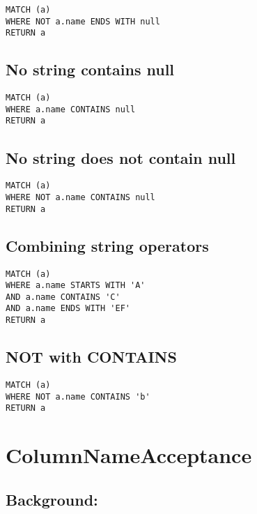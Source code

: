 \begin{lstlisting}
MATCH (a)
WHERE NOT a.name ENDS WITH null
RETURN a
\end{lstlisting}

\subsection{No string contains null}

\begin{lstlisting}
MATCH (a)
WHERE a.name CONTAINS null
RETURN a
\end{lstlisting}

\subsection{No string does not contain null}

\begin{lstlisting}
MATCH (a)
WHERE NOT a.name CONTAINS null
RETURN a
\end{lstlisting}

\subsection{Combining string operators}

\begin{lstlisting}
MATCH (a)
WHERE a.name STARTS WITH 'A'
AND a.name CONTAINS 'C'
AND a.name ENDS WITH 'EF'
RETURN a
\end{lstlisting}

\subsection{NOT with CONTAINS}

\begin{lstlisting}
MATCH (a)
WHERE NOT a.name CONTAINS 'b'
RETURN a
\end{lstlisting}
\section{ColumnNameAcceptance}


\subsection{Background:}

\begin{lstlisting}
\end{lstlisting}

